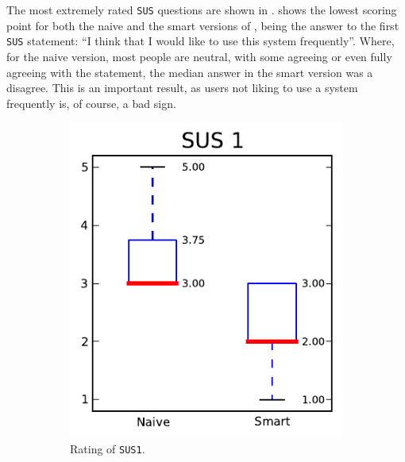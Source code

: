 The most extremely rated \verb|SUS| questions are shown in .  shows the lowest scoring point for both the naive and the smart versions of \oframp, being the answer to the first \verb|SUS| statement: ``I think that I would like to use this system frequently''. Where, for the naive version, most people are neutral, with some agreeing or even fully agreeing with the statement, the median answer in the smart version was a disagree. This is an important result, as users not liking to use a system frequently is, of course, a bad sign.

\begin{figure}[h!]
\centering
\begin{subfigure}[t]{0.32\textwidth}
\centering
\includegraphics[width=\textwidth]{img/graphs/4a_00.pdf}
\caption{Rating of \texttt{SUS1}.}
\end{subfigure}%
~
\begin{subfigure}[t]{0.32\textwidth}
\centering

\end{subfigure}
\end{figure}
